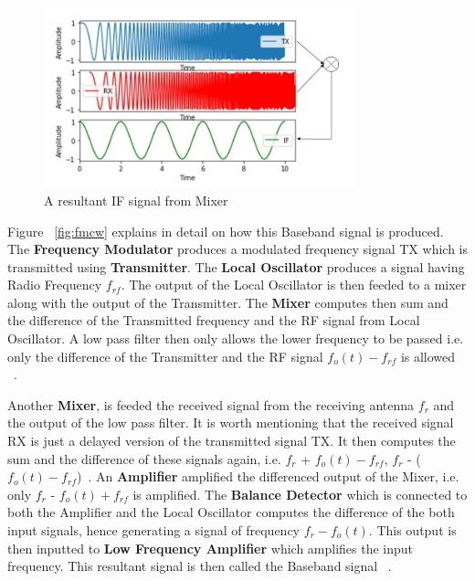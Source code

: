  \begin{figure}[ht]
  \begin{center}
    \includegraphics[width=0.80\textwidth]{Master's thesis/images/mixer.jpg} 
    \caption{A resultant IF signal from Mixer}
    \label{fig:Mixer}
  \end{center}
\end{figure}  

Figure ~\ref{fig:fmcw} explains in detail on how this Baseband signal is produced. 
The \textbf{Frequency Modulator} produces a modulated frequency signal TX which is transmitted using \textbf{Transmitter}. The \textbf{Local Oscillator} produces a signal having Radio Frequency \(f_{rf}\). The output of the Local Oscillator is then feeded to a mixer along with the output of the Transmitter. The \textbf{Mixer} computes then sum and the difference of the Transmitted frequency and the RF signal from Local Oscillator. A low pass filter then only allows the lower frequency to be passed i.e. only the difference of the Transmitter and the RF signal \(f_o(t) - f_{rf}\) is allowed ~\cite{tutorialspoint}. 

Another \textbf{Mixer}, is feeded the received signal from the receiving antenna \(f_r\) and the output of the low pass filter. It is worth mentioning that the received signal RX is just a delayed version of the transmitted signal TX. It then computes the sum and the difference of these signals again, i.e. \(f_r\) + \(f_o(t) - f_{rf}\), \(f_r\) - (\(f_o(t) - f_{rf}\))~\cite{tutorialspoint}. An \textbf{Amplifier} amplified the differenced output of the Mixer, i.e. only \(f_r\) - \(f_o(t) + f_{rf}\) is amplified. The \textbf{Balance Detector} which is connected to both the Amplifier and the Local Oscillator computes the difference of the both input signals, hence generating a signal of frequency \(f_r - f_o(t)\). 
This output is then inputted to \textbf{Low Frequency Amplifier} which amplifies the input frequency. This resultant signal is then called the Baseband signal ~\cite{tutorialspoint}. 

